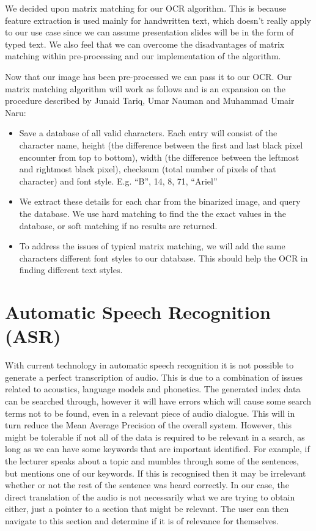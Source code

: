 \documentclass[a4paper,12pt]{article}
\begin{document}
We decided upon matrix matching for our OCR algorithm. This is because feature extraction is used mainly for handwritten text, which doesn’t really apply to our use case since we can assume presentation slides will be in the form of typed text. We also feel that we can overcome the disadvantages of matrix matching within pre-processing and our implementation of the algorithm.

Now that our image has been pre-processed we can pass it to our OCR. Our matrix matching algorithm will work as follows and is an expansion on the procedure described by Junaid Tariq, Umar Nauman and Muhammad Umair Naru\cite{vocr_base}:

\begin{itemize}
\item
Save a database of all valid characters. Each entry will consist of the character name, height (the difference between the first and last black pixel encounter from top to bottom), width (the difference between the leftmost and rightmost black pixel), checksum (total number of pixels of that character) and font style. E.g. “B”, 14, 8, 71, “Ariel”

\item
We extract these details for each char from the binarized image, and query the database. We use hard matching to find the the exact values in the database, or soft matching if no results are returned.

\item
To address the issues of typical matrix matching, we will add the same characters different font styles to our database. This should help the OCR in finding different text styles.
\end{itemize}

\section{Automatic Speech Recognition (ASR)}

With current technology in automatic speech recognition it is not possible to generate a perfect transcription of audio. This is due to a combination of issues related to acoustics, language models and phonetics. The generated index data can be searched through, however it will have errors which will cause some search terms not to be found, even in a relevant piece of audio dialogue. This will in turn reduce the Mean Average Precision of the overall system. However, this might be tolerable if not all of the data is required to be relevant in a search, as long as we can have some keywords that are important identified. For example, if the lecturer speaks about a topic and mumbles through some of the sentences, but mentions one of our keywords. If this is recognised then it may be irrelevant whether or not the rest of the sentence was heard correctly. In our case, the direct translation of the audio is not necessarily what we are trying to obtain either, just a pointer to a section that might be relevant. The user can then navigate to this section and determine if it is of relevance for themselves.
\end{document}
